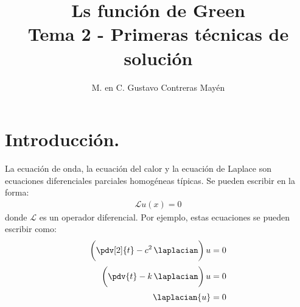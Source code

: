 
\title{Ls función de Green \\ \large {Tema 2 - Primeras técnicas de solución} \vspace{-3ex}}
\author{M. en C. Gustavo Contreras Mayén}
\date{ }

\pagestyle{fancy}
\fancyhf{}
\lhead{\leftmark}
\rfoot{\thepage}
\setlength{\headheight}{16pt}%


\vspace{-4cm}
\maketitle
\fontsize{14}{14}\selectfont
\tableofcontents
\newpage


\section{Introducción.}

La ecuación de onda, la ecuación del calor y la ecuación de Laplace son ecuaciones diferenciales parciales homogéneas típicas. Se pueden escribir en la forma:
\begin{align*}
\mathcal{L} u (x) = 0
\end{align*}
donde $\mathcal{L}$ es un operador diferencial. Por ejemplo, estas ecuaciones se pueden escribir como:
\begin{align*}
\bigg( \pdv[2]{t} - c^{2} \, \laplacian \bigg) \, u &= 0 \\[0.25em]
\bigg( \pdv{t} - k \, \laplacian \bigg) \, u &= 0 \\[0.25em]
\laplacian{u} &= 0
\end{align*}

